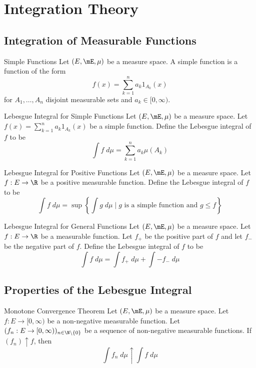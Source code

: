 \documentclass[a4paper]{article}
\begin{document}
\pagebreak
\section{Integration Theory}
\subsection{Integration of Measurable Functions}
\begin{defn}{Simple Functions}{} Let $(E,\mE,\mu)$ be a measure space. A simple function is a function of the form $$f(x)=\sum_{k=1}^na_k1_{A_k}(x)$$ for $A_1,\dots,A_n$ disjoint measurable sets and $a_k\in[0,\infty)$. 
\end{defn}

\begin{defn}{Lebesgue Integral for Simple Functions}{} Let $(E,\mE,\mu)$ be a measure space. Let $f(x)=\sum_{k=1}^na_k1_{A_k}(x)$ be a simple function. Define the Lebesgue integral of $f$ to be $$\int f\;d\mu=\sum_{k=1}^na_k\mu(A_k)$$
\end{defn}

\begin{lmm}{}{}
\end{lmm}

\begin{defn}{Lebesgue Integral for Positive Functions}{} Let $(E,\mE,\mu)$ be a measure space. Let $f:E\to\R$ be a positive measurable function. Define the Lebesgue integral of $f$ to be $$\int f\;d\mu=\sup\left\{\int g\;d\mu\;|\;g\text{ is a simple function and }g\leq f\right\}$$
\end{defn}

\begin{defn}{Lebesgue Integral for General Functions}{} Let $(E,\mE,\mu)$ be a measure space. Let $f:E\to\R$ be a measurable function. Let $f_+$ be the positive part of $f$ and let $f_-$ be the negative part of $f$. Define the Lebesgue integral of $f$ to be $$\int f\;d\mu=\int f_+\;d\mu+\int -f_-\;d\mu$$
\end{defn}

\subsection{Properties of the Lebesgue Integral}
\begin{thm}{Monotone Convergence Theorem}{} Let $(E,\mE,\mu)$ be a measure space. Let $f:E\to[0,\infty)$ be a non-negative measurable function. Let $(f_n:E\to[0,\infty))_{n\in\N\setminus\{0\}}$ be a sequence of non-negative measurable functions. If $(f_n)\uparrow f$, then $$\int f_n\;d\mu\uparrow\int f\;d\mu$$
\end{thm}
\end{document}
